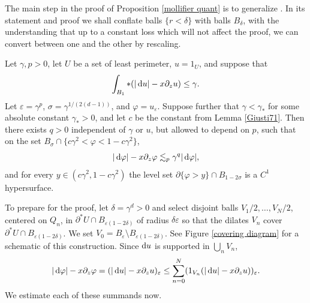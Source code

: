 The main step in the proof of Proposition \ref{mollifier quant} is to generalize \cite[Theorem 7.3, Remark 7.4]{Giusti77}.
In its statement and proof we shall conflate balls $\{r < \delta\}$ with balls $B_\delta$, with the understanding that up to a constant loss which will not affect the proof, we can convert between one and the other by rescaling.

\begin{lemma}\label{main mollifier lemma}
Let $\gamma, p > 0$, let $U$ be a set of least perimeter, $u = 1_U$, and suppose that
\begin{equation}\label{hypothesis on main mollifier lemma}
\int_{B_1} *(|\mathop{}\!\mathrm{d} u| - x\partial_z u) \leq \gamma.
\end{equation}
Let $\varepsilon = \gamma^p$, $\sigma = \gamma^{1/(2(d - 1))}$, and $\varphi = u_\varepsilon$.
Suppose further that $\gamma < \gamma_*$ for some absolute constant $\gamma_* > 0$, and let $c$ be the constant from Lemma \ref{Giusti71}.
Then there exists $q > 0$ independent of $\gamma$ or $u$, but allowed to depend on $p$, such that on the set $B_\sigma \cap \{c\gamma^2 < \varphi < 1 - c\gamma^2\}$,
\begin{equation}\label{claim on main mollifier lemma}
|\mathop{}\!\mathrm{d} \varphi| - x\partial_z \varphi \lesssim_p \gamma^q |\mathop{}\!\mathrm{d} \varphi|,
\end{equation}
and for every $y \in (c\gamma^2, 1 - c\gamma^2)$ the level set $\partial \{\varphi > y\} \cap B_{1 - 2\sigma}$ is a $C^1$ hypersurface.
\end{lemma}

To prepare for the proof, let $\delta = \gamma^d > 0$ and select disjoint balls $V_1/2, \dots, V_N/2$, centered on $Q_n$, in $\partial^* U \cap B_{\varepsilon(1 - 2\delta)}$ of radius $\delta\varepsilon$ so that the dilates $V_n$ cover $\partial^* U \cap B_{\varepsilon(1 - 2\delta)}$.
We set $V_0 = B_\varepsilon \setminus B_{\varepsilon(1 - 2\delta)}$.
See Figure \ref{covering diagram} for a schematic of this construction.
Since $\mathop{}\!\mathrm{d} u$ is supported in $\bigcup_n V_n$,
$$|\mathop{}\!\mathrm{d} \varphi| - x\partial_z \varphi = (|\mathop{}\!\mathrm{d} u| - x\partial_zu)_\varepsilon \leq \sum_{n=0}^N (1_{V_n}(|\mathop{}\!\mathrm{d} u| - x\partial_zu))_\varepsilon.$$
We estimate each of these summands now.

